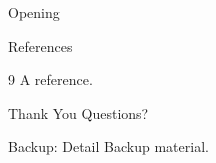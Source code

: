 \documentclass{beamer}
\begin{document}
\begin{frame}{Opening}
\end{frame}
\begin{frame}{References}
  \begin{thebibliography}{9}
     A reference.
  \end{thebibliography}
\end{frame}
\begin{frame}{Thank You}
  Questions?
\end{frame}
\appendix
\begin{frame}{Backup: Detail}
  Backup material.
\end{frame}
\end{document}
